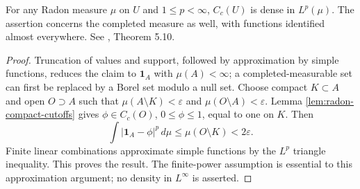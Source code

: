 \begin{theorem}\label{thm:radon-lp-density}
For any Radon measure $\mu$ on $U$ and $1\leq p<\infty$, $C_c(U)$ is dense in $L^p(\mu)$. The assertion concerns the completed measure as well, with functions identified almost everywhere. See \cite{Sim18}, Theorem 5.10.
\end{theorem}
\begin{proof}
Truncation of values and support, followed by approximation by simple functions, reduces the claim to $\mathbf1_A$ with $\mu(A)<\infty$; a completed-measurable set can first be replaced by a Borel set modulo a null set. Choose compact $K\subset A$ and open $O\supset A$ such that $\mu(A\setminus K)<\varepsilon$ and $\mu(O\setminus A)<\varepsilon$. Lemma \ref{lem:radon-compact-cutoffs} gives $\phi\in C_c(O)$, $0\leq\phi\leq1$, equal to one on $K$. Then
\[
 \int|\mathbf1_A-\phi|^p\,d\mu\leq\mu(O\setminus K)<2\varepsilon.
\]
Finite linear combinations approximate simple functions by the $L^p$ triangle inequality. This proves the result. The finite-power assumption is essential to this approximation argument; no density in $L^\infty$ is asserted.
\end{proof}

